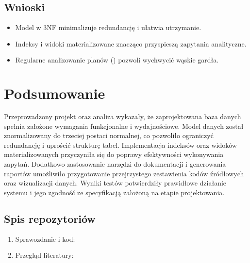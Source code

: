 \documentclass[a4paper,11pt,openany,english]{sphinxmanual}
\begin{document}
\section{Wnioski}
\label{\detokenize{rozdzial4/index:wnioski}}\begin{itemize}
\item {} 
\sphinxAtStartPar
Model w 3NF minimalizuje redundancję i ułatwia utrzymanie.

\item {} 
\sphinxAtStartPar
Indeksy i widoki materializowane znacząco przyspieszą zapytania analityczne.

\item {} 
\sphinxAtStartPar
Regularne analizowanie planów () pozwoli wychwycić wąskie gardła.

\end{itemize}

\sphinxstepscope


\chapter{Podsumowanie}
\label{\detokenize{rozdzial5/index:podsumowanie}}\label{\detokenize{rozdzial5/index::doc}}
\sphinxAtStartPar
Przeprowadzony projekt oraz analiza wykazały, że zaprojektowana baza danych spełnia założone wymagania funkcjonalne i wydajnościowe. Model danych został znormalizowany do trzeciej postaci normalnej, co pozwoliło ograniczyć redundancję i uprościć strukturę tabel. Implementacja indeksów oraz widoków materializowanych przyczyniła się do poprawy efektywności wykonywania zapytań. Dodatkowo zastosowanie narzędzi do dokumentacji i generowania raportów umożliwiło przygotowanie przejrzystego zestawienia kodów źródłowych oraz wizualizacji danych. Wyniki testów potwierdziły prawidłowe działanie systemu i jego zgodność ze specyfikacją założoną na etapie projektowania.


\section{Spis repozytoriów}
\label{\detokenize{rozdzial5/index:spis-repozytoriow}}\begin{enumerate}
%
\item {} 
\sphinxAtStartPar
Sprawozdanie i kod: 

\item {} 
\sphinxAtStartPar
Przegląd literatury: 

\end{enumerate}



\renewcommand{\indexname}{Index}
\printindex
\end{document}
